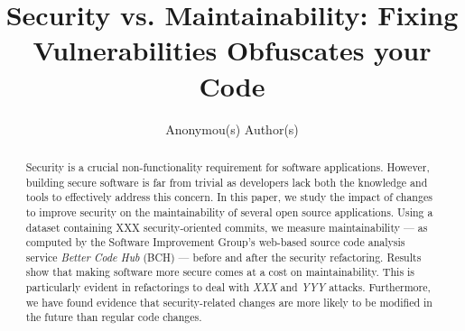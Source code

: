\documentclass[10pt,conference]{IEEEtran}
\begin{document}
\title{Security vs. Maintainability: Fixing Vulnerabilities Obfuscates your Code%
}

\author{
    Anonymou(s) Author(s)
}

\maketitle

\begin{abstract}
  Security is a crucial non-functionality requirement for software applications.
  However, building secure software is far from trivial as developers lack both
  the knowledge and tools to effectively address this concern. In this paper, we
  study the impact of changes to improve security on the maintainability of several
  open source applications. Using a dataset containing XXX security-oriented
  commits, we measure maintainability --- as computed by the Software Improvement
  Group's web-based source code analysis service \emph{Better Code Hub} (BCH) ---
  before and after the security refactoring. Results show that making software
  more secure comes at a cost on  maintainability. This is particularly evident
  in refactorings to deal with \emph{XXX} and \emph{YYY} attacks.
  Furthermore, we have found evidence that security-related changes are more
  likely to be modified in the future than regular code changes.
\end{abstract}
\end{document}
